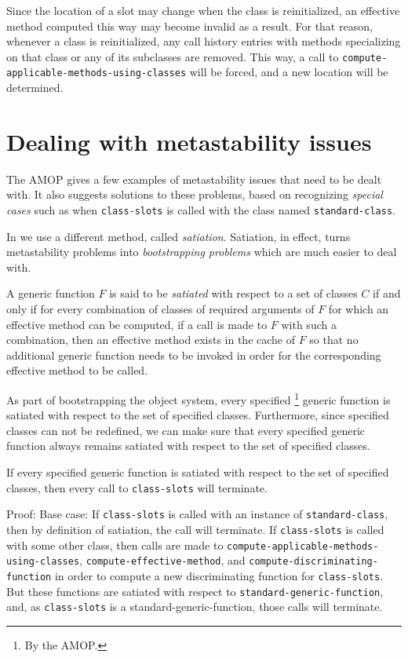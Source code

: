 Since the location of a slot may change when the class is
reinitialized, an effective method computed this way may become
invalid as a result.  For that reason, whenever a class is
reinitialized, any call history entries with methods specializing on
that class or any of its subclasses are removed.  This way, a call to
\texttt{compute-applicable-methods-using-classes} will be forced, and
a new location will be determined.

\section{Dealing with metastability issues}
\label{sec-object-system-dealing-with-metastability-issues}

The AMOP gives a few examples of metastability issues that need to be
dealt with.  It also suggests solutions to these problems, based on
recognizing \emph{special cases} such as when \texttt{class-slots} is
called with the class named \texttt{standard-class}.  

In \sysname{} we use a different method, called \emph{satiation}. 
Satiation, in effect, turns metastability problems into
\emph{bootstrapping problems} which are much easier to deal with.

\begin{definition}
A generic function $F$ is said to be \emph{satiated} with respect to a
set of classes $C$ if and only if for every combination of classes of
required arguments of $F$ for which an effective method can be
computed, if a call is made to $F$ with such a combination, then an
effective method exists in the cache of $F$ so that no additional
generic function needs to be invoked in order for the corresponding
effective method to be called.
\end{definition}

As part of bootstrapping the object system, every specified%
\footnote{By the AMOP.} generic function is satiated with respect to
the set of specified classes.  Furthermore, since specified classes
can not be redefined, we can make sure that every specified generic
function always remains satiated with respect to the set of specified
classes.

\begin{theorem}
If every specified generic function is satiated with respect to the
set of specified classes, then every call to \texttt{class-slots} will
terminate.
\end{theorem}

Proof: Base case: If \texttt{class-slots} is called with an instance
of \texttt{standard-class}, then by definition of satiation, the call
will terminate.  If \texttt{class-slots} is called with some other
class, then calls are made to
\texttt{compute-applicable-methods-using-classes},
\texttt{compute-effective-method}, and
\texttt{compute-discriminating-function} in order to compute a new
discriminating function for \texttt{class-slots}.  But these functions
are satiated with respect to \texttt{standard-generic-function}, and, as
\texttt{class-slots} is a standard-generic-function, those calls
will terminate. 

